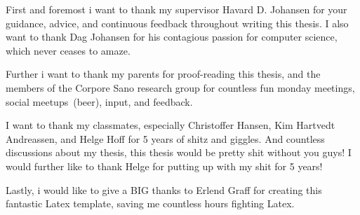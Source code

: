 \documentclass[USenglish]{uit-thesis}
\begin{document}
\begin{acknowledgement}
First and foremost i want to thank my supervisor Havard D. Johansen for your guidance, advice, and continuous feedback throughout writing this thesis. 
I also want to thank Dag Johansen for his contagious passion for computer science, which never ceases to amaze.

Further i want to thank my parents for proof-reading this thesis, and the members of the Corpore Sano research group for countless fun monday meetings, social meetups~(beer), input, and feedback.

I want to thank my classmates, especially Christoffer Hansen, Kim Hartvedt Andreassen, and Helge Hoff for 5 years of shitz and giggles.
And countless discussions about my thesis, this thesis would be pretty shit without you guys!
I would further like to thank Helge for putting up with my shit for 5 years!

Lastly, i would like to give a {\Huge BIG} thanks to Erlend Graff for creating this fantastic Latex template, saving me countless hours fighting Latex.


 
\end{acknowledgement}

\tableofcontents
\listofcodedefinition
\printacronyms

\mainmatter
\end{document}
